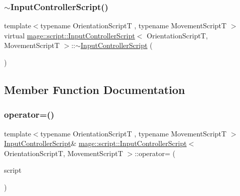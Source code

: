 \hypertarget{classmage_1_1script_1_1_input_controller_script_ae68fc8ff7d4527a9524c405f94c0e744}{}\label{classmage_1_1script_1_1_input_controller_script_ae68fc8ff7d4527a9524c405f94c0e744} 
\subsubsection{\texorpdfstring{$\sim$\+Input\+Controller\+Script()}{~InputControllerScript()}}
{\footnotesize\ttfamily template$<$typename Orientation\+ScriptT , typename Movement\+ScriptT $>$ \\
virtual \hyperlink{classmage_1_1script_1_1_input_controller_script}{mage\+::script\+::\+Input\+Controller\+Script}$<$ Orientation\+ScriptT, Movement\+ScriptT $>$\+::$\sim$\hyperlink{classmage_1_1script_1_1_input_controller_script}{Input\+Controller\+Script} (\begin{DoxyParamCaption}{ }\end{DoxyParamCaption})\hspace{0.3cm}{\ttfamily [virtual]}}



\subsection{Member Function Documentation}
\hypertarget{classmage_1_1script_1_1_input_controller_script_a76bc93d06f25540e2002d1a491fd10e6}{}\label{classmage_1_1script_1_1_input_controller_script_a76bc93d06f25540e2002d1a491fd10e6} 
\subsubsection{\texorpdfstring{operator=()}{operator=()}\hspace{0.1cm}{\footnotesize\ttfamily [1/2]}}
{\footnotesize\ttfamily template$<$typename Orientation\+ScriptT , typename Movement\+ScriptT $>$ \\
\hyperlink{classmage_1_1script_1_1_input_controller_script}{Input\+Controller\+Script}\& \hyperlink{classmage_1_1script_1_1_input_controller_script}{mage\+::script\+::\+Input\+Controller\+Script}$<$ Orientation\+ScriptT, Movement\+ScriptT $>$\+::operator= (\begin{DoxyParamCaption}\item[{const \hyperlink{classmage_1_1script_1_1_input_controller_script}{Input\+Controller\+Script}$<$ Orientation\+ScriptT, Movement\+ScriptT $>$ \&}]{script }\end{DoxyParamCaption})\hspace{0.3cm}{\ttfamily [delete]}}

